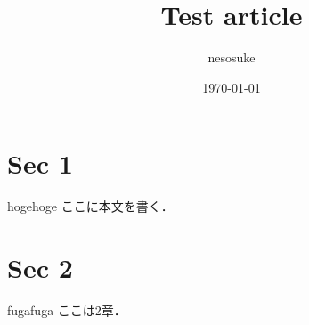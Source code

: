 \documentclass{ltjsarticle}
\author{nesosuke}
\title{Test article}
\date{\today}
\begin{document}
\maketitle


\section{Sec 1}
hogehoge
ここに本文を書く．

\section{Sec 2}
fugafuga
ここは2章．
\end{document}
